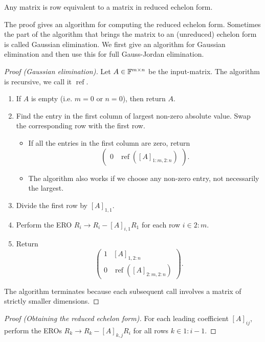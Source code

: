 \begin{proposition}
Any matrix is row equivalent to a matrix in reduced echelon form.
\end{proposition}
The proof gives an algorithm for computing the reduced echelon form. Sometimes the part of the algorithm that brings the matrix to an (unreduced) echelon form is called Gaussian elimination. We first give an algorithm for Gaussian elimination and then use this for full Gauss-Jordan elimination.
\begin{proof}[Proof (Gaussian elimination)]
Let $A\in\mathbb{F}^{m\times n}$ be the input-matrix. The algorithm is recursive, we call it $\operatorname{ref}$.
\begin{enumerate}
\item If $A$ is empty (i.e. $m=0$ or $n=0$), then return $A$.
\item Find the entry in the first column of largest non-zero absolute value. Swap the corresponding row with the first row.
\begin{itemize}
\item If all the entries in the first column are zero, return
\[ \begin{pmatrix}
0 & \operatorname{ref}\left([A]_{1:m,2:n}\right)
\end{pmatrix}. \]
\item The algorithm also works if we choose any non-zero entry, not necessarily the largest.
\end{itemize}
\item Divide the first row by $[A]_{1,1}$.
\item Perform the ERO $R_i\to R_i - [A]_{i,1}R_1$ for each row $i\in 2:m$.
\item Return
\[ \begin{pmatrix}
1 & [A]_{1,2:n} \\
0 & \operatorname{ref}\left([A]_{2:m,2:n}\right)
\end{pmatrix}. \]
\end{enumerate}
The algorithm terminates because each subsequent call involves a matrix of strictly smaller dimensions.
\end{proof}
\begin{proof}[Proof (Obtaining the reduced echelon form)]
For each leading coefficient $[A]_{ij}$, perform the EROs $R_k\to R_k-[A]_{k,j}R_i$ for all rows $k\in 1:i-1$.
\end{proof}

